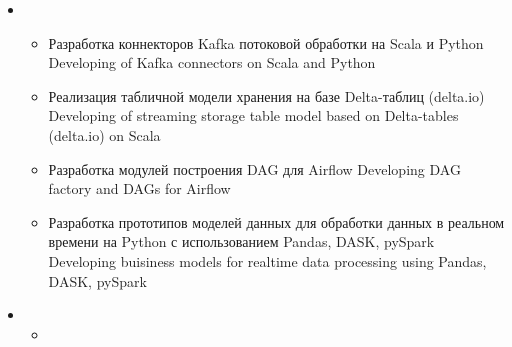 \documentclass[11pt,a4paper,sans, russian]{moderncv}        %
\begin{document}
{\begin{itemize}
\begin{itemize}
			\item {}
				{Разработка архитектуры интеграции Hadoop и Kubernetes}
				{Hadoop and Kubernetes integration}
			\item {}
				{Разработка архитектуры DataGovernance и DataLineage: LinkedIn DataHub, Atlas}
				{Desing and implementation of a data governance and data lineage subsystem: LinkedIn DataHub, Apache Atlas}
			\item {}
				{Разработка архитектуры подсистемы качества данных: GreatExpectaion, Apache Griffin}
				{Design and implementation of a data quality and data assurance subsystem: Great Expectations, Apache Griffin}
			\item {}
				{Разработка архитектуры виртуализации данных и интеграции озера данных с существующим хранилищем данных, миграция с Hive на Trino}
				{Desing and implementation of data virtualization subsystem: Trino; DWH intergation: PolyBase}
			\item {}
				{Разработка и внедрение архитектуры оркестрации данных с использованием Alluxio}
				{Desing of data orchestration subsystem: Alluxio }
		\end{itemize}
		\item {}
		\begin{itemize}
			\item {}
				{Разработка коннекторов Kafka потоковой обработки на Scala и Python}
				{Developing of Kafka connectors on Scala and Python}
			\item {}
				{Реализация табличной модели хранения на базе Delta-таблиц (delta.io)}
				{Developing of streaming storage table model based on Delta-tables (delta.io) on Scala}
			\item {}
				{Разработка модулей построения DAG для Airflow}
				{Developing DAG factory and DAGs for Airflow}
			\item {}
				{Разработка прототипов моделей данных для обработки данных в реальном времени на Python с использованием Pandas, DASK, pySpark}
				{Developing buisiness models for realtime data processing using Pandas, DASK, pySpark}
		\end{itemize}
		\item {}
		\begin{itemize}
			\item {}

\end{itemize}
\end{itemize}}
\end{document}
